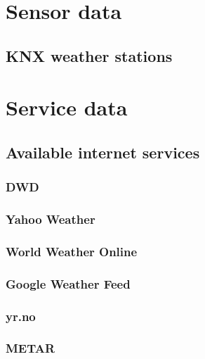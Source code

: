 

\section{Sensor data}

\subsection{KNX weather stations}

\section{Service data}

\subsection{Available internet services}


\subsubsection{DWD}

\subsubsection{Yahoo Weather}

\subsubsection{World Weather Online}

\subsubsection{Google Weather Feed}

\subsubsection{yr.no}

\subsubsection{METAR}

